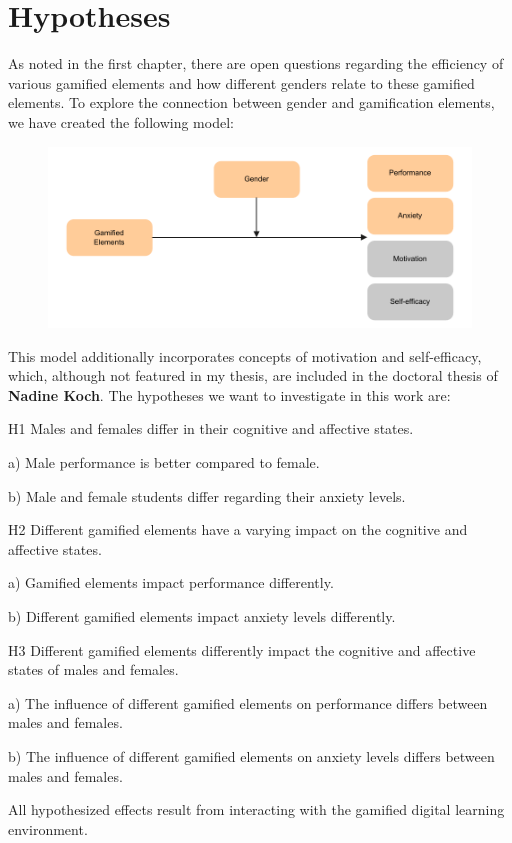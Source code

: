 \section{Hypotheses}

As noted in the first chapter, there are open questions regarding the efficiency of various gamified elements and how different genders relate to these gamified elements.
To explore the connection between gender and gamification elements, we have created the following model:\newline

\begin{figure}[H]
    \centering
    \includegraphics{img/Hypotheses}
    \label{fig:figureHypotheses}
\end{figure}
This model additionally incorporates concepts of motivation and self-efficacy, which, although not featured in my thesis, are included in the doctoral thesis of \textbf{Nadine Koch}.\newline
The hypotheses we want to investigate in this work are:
\begin{APAitemize}
    \item[H1] Males and females differ in their cognitive and affective states.
    \begin{APAitemize}
        \item[a)] Male performance is better compared to female.
        \item[b)] Male and female students differ regarding their anxiety levels.
    \end{APAitemize}
    \item[H2] Different gamified elements have a varying impact on the cognitive and affective states.
    \begin{APAitemize}
        \item[a)] Gamified elements impact performance differently.
        \item[b)] Different gamified elements impact anxiety levels differently.
    \end{APAitemize}
    \item[H3] Different gamified elements differently impact the cognitive and affective states of males and females.
    \begin{APAitemize}
        \item[a)] The influence of different gamified elements on performance differs between males and females.
        \item[b)] The influence of different gamified elements on anxiety levels differs between males and females.
    \end{APAitemize}
\end{APAitemize}
All hypothesized effects result from interacting with the gamified digital learning environment.